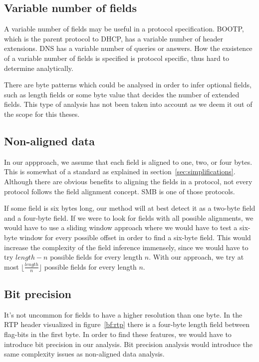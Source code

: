 \documentclass[a4paper]{report}
\begin{document}
\subsection{Variable number of fields}
A variable number of fields may be useful in a protocol specification. BOOTP,
which is the parent protocol to DHCP, has a variable number of header extensions.
DNS has a variable number of queries or answers. How the exsistence of a variable
number of fields is specified is protocol specific, thus hard to determine
analytically. 

There are byte patterns which could be analysed in order to infer optional
fields, such as length fields or some byte value that decides the number of
extended fields. This type of analysis has not been taken into account as we
deem it out of the scope for this theses.

\subsection{Non-aligned data}
In our appproach, we assume that each field is aligned to one, two, or four
bytes. This is somewhat of a standard as explained in
section~\ref{sec:simplifications}. Although there are obvious benefits to
aligning the fields in a protocol, not every protocol follows the field
alignment concept. SMB is one of those protocols.

If some field is six bytes long, our method will at best detect it as a
two-byte field and a four-byte field. If we were to look for fields with
all possible alignments, we would have to use a sliding window approach where
we would have to test a six-byte window for every possible offset in order
to find a six-byte field. This would increase the complexity of the field
inference immensely, since we would have to try $length - n$ possible fields
for every length $n$. With our approach, we try at most
$\lfloor \frac{length}{n} \rfloor$ possible fields for every length $n$.

\subsection{Bit precision}
It's not uncommon for fields to have a higher resolution than one byte. In
the RTP header visualized in figure~\ref{bf:rtp} there is a four-byte length
field between flag-bits in the first byte. In order to find these features,
we would have to introduce bit precision in our analysis. Bit precision
analysis would introduce the same complexity issues as non-aligned data
analysis. 
\end{document}

